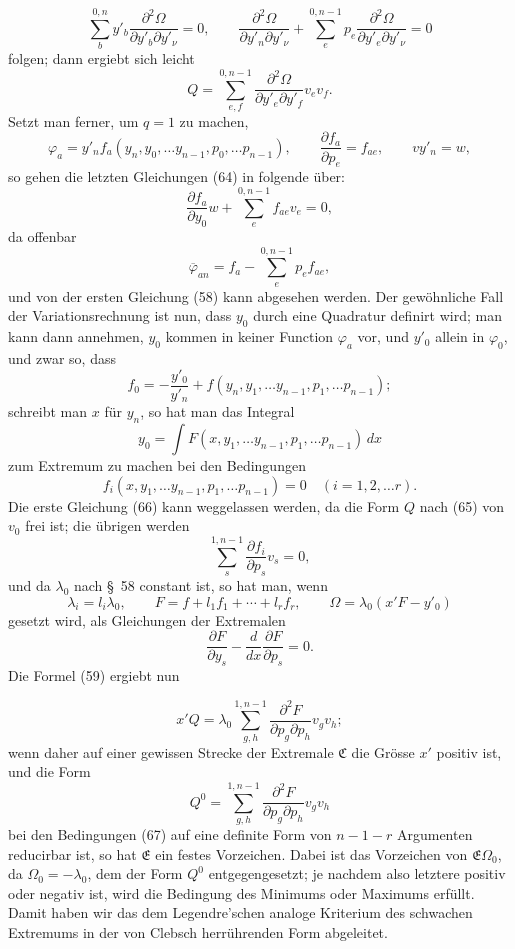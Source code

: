 \documentclass[11pt,a4paper,leqno]{article}
\begin{document}
\[
\sum_b^{0,n}y'_b
\frac{\partial^2\Omega}{\partial y'_b\partial y'_\nu}=0,\qquad
\frac{\partial^2\Omega}{\partial y'_n\partial y'_\nu}
+\sum_e^{0,n-1}p_e
\frac{\partial^2\Omega}{\partial y'_e\partial y'_\nu}=0
\]
folgen; dann ergiebt sich leicht
\begin{equation}\tag{65}
Q=\sum_{e,f}^{0,n-1}
\frac{\partial^2\Omega}{\partial y'_e\partial y'_f}v_ev_f.
\end{equation}
Setzt man ferner, um $q=1$ zu machen,
\[
\varphi_a=y'_n f_a(y_n,y_0,\ldots y_{n-1},p_0,\ldots p_{n-1}),\qquad
\frac{\partial f_a}{\partial p_e}=f_{ae},\qquad vy'_n=w,
\]
so gehen die letzten Gleichungen (64) in folgende über:
\begin{equation}\tag{66}
\frac{\partial f_a}{\partial y_0}w
+\sum_e^{0,n-1}f_{ae}v_e=0,
\end{equation}
da offenbar
\[
\overline{\varphi}_{an}=f_a-\sum_e^{0,n-1}p_e f_{ae},
\]
und von der ersten Gleichung (58) kann abgesehen werden. Der gewöhnliche
Fall der Variationsrechnung ist nun, dass $y_0$ durch eine Quadratur
definirt wird; man kann dann annehmen, $y_0$ kommen in keiner Function
$\varphi_a$ vor, und $y'_0$ allein in $\varphi_0$, und zwar so, dass
\[
f_0=-\frac{y'_0}{y'_n}
+f(y_n,y_1,\ldots y_{n-1},p_1,\ldots p_{n-1});
\]
schreibt man $x$ für $y_n$, so hat man das Integral
\[
y_0=\int F(x,y_1,\ldots y_{n-1},p_1,\ldots p_{n-1})\,dx
\]
zum Extremum zu machen bei den Bedingungen
\[
f_i(x,y_1,\ldots y_{n-1},p_1,\ldots p_{n-1})=0
\quad(i=1,2,\ldots r).
\]
Die erste Gleichung (66) kann weggelassen werden, da die Form $Q$ nach
(65) von $v_0$ frei ist; die übrigen werden
\begin{equation}\tag{67}
\sum_s^{1,n-1}\frac{\partial f_i}{\partial p_s}v_s=0,
\end{equation}
und da $\lambda_0$ nach \S~58 constant ist, so hat man, wenn
\[
\lambda_i=l_i\lambda_0,\qquad
F=f+l_1f_1+\cdots+l_rf_r,\qquad
\Omega=\lambda_0(x'F-y'_0)
\]
gesetzt wird, als Gleichungen der Extremalen
\[
\frac{\partial F}{\partial y_s}
-\frac{d}{dx}\frac{\partial F}{\partial p_s}=0.
\]
Die Formel (59) ergiebt nun

\[
x'Q=\lambda_0\sum_{g,h}^{1,n-1}
\frac{\partial^2F}{\partial p_g\partial p_h}v_gv_h;
\]
wenn daher auf einer gewissen Strecke der Extremale $\mathfrak{C}$ die
Grösse $x'$ positiv ist, und die Form
\[
Q^0=\sum_{g,h}^{1,n-1}
\frac{\partial^2F}{\partial p_g\partial p_h}v_gv_h
\]
bei den Bedingungen (67) auf eine definite Form von $n-1-r$ Argumenten
reducirbar ist, so hat $\mathfrak{E}$ ein festes Vorzeichen. Dabei ist
das Vorzeichen von $\mathfrak{E}\Omega_0$, da $\Omega_0=-\lambda_0$,
dem der Form $Q^0$ entgegengesetzt; je nachdem also letztere positiv
oder negativ ist, wird die Bedingung des Minimums oder Maximums erfüllt.
Damit haben wir das dem Legendre'schen analoge Kriterium des schwachen
Extremums in der von Clebsch herrührenden Form abgeleitet.
\end{document}
